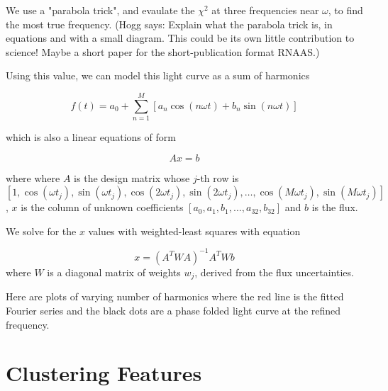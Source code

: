 \documentclass{article}
\newcommand{\hogg}[1]{{\color{blue} (Hogg says: #1)}}
\begin{document}
\medskip
We use a "parabola trick", and evaulate the $\chi^2$ at three frequencies near $\omega$,  to find the most true frequency.
\hogg{Explain what the parabola trick is, in equations and with a small diagram. This could be its own little contribution to science! Maybe a short paper for the short-publication format RNAAS.}

\medskip
Using this value, we can model this light curve as a sum of harmonics

\begin{equation}
f(t) = a_0 + \sum_{n=1}^{M} \left[ a_n \cos(n \omega t) + b_n \sin(n \omega t) \right]
\end{equation}

which is also a linear equations of form 

\begin{equation}
Ax = b
\end{equation}

where where $A$ is the design matrix whose $j$-th row is 
$[1, \cos(\omega t_j), \sin(\omega t_j), \cos(2\omega t_j), \sin(2\omega t_j), \dots, \cos(M\omega t_j), \sin(M\omega t_j)]$,  $x$ is the column of unknown coefficients $[a_0, a_1, b_1, ..., a_{32}, b_{32}]$ and $b$ is the flux.

\medskip
We solve for the $x$ values with weighted-least squares with equation 

\begin{equation}
x = (A^T W A)^{-1} A^T W b
\end{equation}
where $W$ is a diagonal matrix of weights $w_j$, derived from the flux uncertainties.

\medskip
Here are  plots of varying number of harmonics where the red line is the fitted Fourier series and the black dots are a phase folded light curve at the refined frequency.


\begin{figure}[h]
    \centering
    \label{fig:placeholder}
\end{figure}

\begin{figure}[h]
    \centering
    \label{fig:placeholder}
\end{figure}

\section{Clustering Features}
\end{document}

